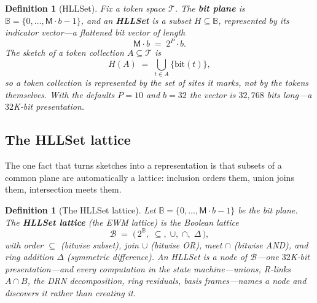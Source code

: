\documentclass[11pt,a4paper]{article}
\newtheorem{definition}[theorem]{Definition}
\theoremstyle{remark}
\newcommand{\Reg}{\ensuremath{\mathsf{M}}}          %
\newcommand{\Prec}{\ensuremath{P}}                  %
\newcommand{\Bits}{\ensuremath{b}}                  %
\newcommand{\Lat}{\ensuremath{\mathcal{B}}}         %
\newcommand{\Plane}{\ensuremath{\mathbb{B}}}        %
\newcommand{\Tok}{\ensuremath{\mathcal{T}}}         %
\begin{document}
\begin{definition}[HLLSet]
\label{def:hllset}
Fix a token space $\Tok$. The \textbf{bit plane} is
$\Plane = \{0,\dots,\Reg\cdot\Bits-1\}$, and an \textbf{HLLSet} is a subset
$H \subseteq \Plane$, represented by its indicator vector---a flattened bit
vector of length
\begin{equation}
  \label{eq:vectorlength}
  \Reg\cdot\Bits \;=\; 2^{\Prec}\cdot\Bits.
\end{equation}
The sketch of a token collection $A \subseteq \Tok$ is
\begin{equation}
  \label{eq:sketch}
  H(A) \;=\; \bigcup_{t\in A}\bigl\{\mathrm{bit}(t)\bigr\},
\end{equation}
so a token collection is represented by the set of sites it marks, not by the
tokens themselves. With the defaults $\Prec=10$ and $\Bits=32$ the vector is
$32{,}768$ bits long---a $32$K-bit presentation.
\end{definition}

\subsection{The HLLSet lattice}

The one fact that turns sketches into a representation is that subsets of a
common plane are automatically a lattice: inclusion orders them, union joins
them, intersection meets them.

\begin{definition}[The HLLSet lattice]
\label{def:lattice}
Let $\Plane = \{0,\dots,\Reg\cdot\Bits-1\}$ be the bit plane. The
\textbf{HLLSet lattice} (the EWM lattice) is the Boolean lattice
\begin{equation}
  \Lat \;=\; \bigl(\,2^{\Plane},\; \subseteq,\; \cup,\; \cap,\; \Delta\,\bigr),
\end{equation}
with order $\subseteq$ (bitwise subset), join $\cup$ (bitwise OR), meet $\cap$
(bitwise AND), and ring addition $\Delta$ (symmetric difference). An HLLSet is
a node of $\Lat$---one $32$K-bit presentation---and every computation in the
state machine---unions, R-links $A\cap B$, the DRN decomposition, ring
residuals, basis frames---names a node and \emph{discovers} it rather than
creating it.
\end{definition}
\end{document}
